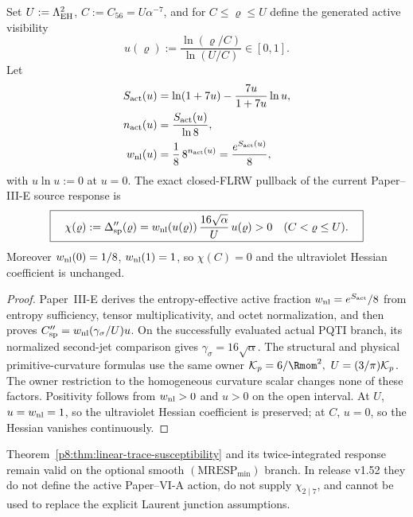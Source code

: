 \documentclass[12pt,a4paper]{article}
\begin{document}
\begin{theorem}
\label{p8:thm:linear-trace-susceptibility}
Set \(U:=\Lambda_{\rm EH}^{2}\),
\(C:=C_{56}=U\alpha^{-7}\), and for
\(C\le\varrho\le U\) define the generated active visibility
\begin{equation}
\label{p8:eq:active-log-visibility-current}
 u(\varrho):=\frac{\ln(\varrho/C)}{\ln(U/C)}\in[0,1].
\end{equation}
Let
\begin{align}
\label{p8:eq:active-entropy-weight-current}
 S_{\rm act}(u)
 &=\ln(1+7u)-\frac{7u}{1+7u}\ln u,\\
 n_{\rm act}(u)&=\frac{S_{\rm act}(u)}{\ln8},\\
 w_{\rm nl}(u)&=\frac18\,8^{n_{\rm act}(u)}=\frac{e^{S_{\rm act}(u)}}8,
\end{align}
with \(u\ln u:=0\) at \(u=0\).  The exact closed-FLRW pullback of the
current Paper--III-E source response is
\begin{equation}
\label{p8:eq:p3-smooth-resolution-handoff}
 \boxed{\quad
 \chi(\varrho):=\Delta_{\rm sp}''(\varrho)
 =w_{\rm nl}(u(\varrho))\,
   \frac{16\sqrt\alpha}{U}\,u(\varrho)>0
 \quad(C<\varrho\le U).\quad}
\end{equation}
Moreover \(w_{\rm nl}(0)=1/8\), \(w_{\rm nl}(1)=1\), so
\(\chi(C)=0\) and the ultraviolet Hessian coefficient is unchanged.
\end{theorem}

\begin{proof}
Paper~III-E derives the entropy-effective active fraction
\(w_{\rm nl}=e^{S_{\rm act}}/8\) from entropy sufficiency, tensor
multiplicativity, and octet normalization, and then proves
\(C_{\rm sp}''=w_{\rm nl}(\gamma_\sigma/U)u\).  On the successfully evaluated actual PQTI branch,
its normalized second-jet comparison gives \(\gamma_\sigma=16\sqrt\alpha\).  The structural and physical primitive-curvature formulas use the same owner \(\mathcal K_p=6/\Rmom^2,\ U=(3/\pi)\mathcal K_p\).  The owner restriction to the
homogeneous curvature scalar changes none of these factors.  Positivity follows
from \(w_{\rm nl}>0\) and \(u>0\) on the open interval.  At \(U\),
\(u=w_{\rm nl}=1\), so the ultraviolet Hessian coefficient is preserved; at
\(C\), \(u=0\), so the Hessian vanishes continuously.
\end{proof}

\begin{remark}
\label{p8:rem:smooth-mresp-comparison-status}
Theorem~\ref{p8:thm:linear-trace-susceptibility} and its twice-integrated
response remain valid on the optional smooth
\((\mathrm{MRESP}_{\min})\) branch.  In release v1.52 they do not define the
active Paper--VI-A action, do not supply \(\chi_{2\mid7}\), and cannot be used to
replace the explicit Laurent junction assumptions.
\end{remark}
\end{document}
